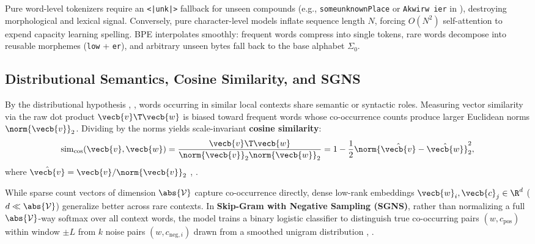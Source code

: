 \documentclass[../../../../master.tex]{subfiles}
\begin{document}
\begin{intuition}
Pure word-level tokenizers require an \texttt{<|unk|>} fallback for unseen compounds (e.g., \texttt{someunknownPlace} or \texttt{Akwirw ier} in ), destroying morphological and lexical signal. Conversely, pure character-level models inflate sequence length $N$, forcing $O(N^2)$ self-attention to expend capacity learning spelling. BPE interpolates smoothly: frequent words compress into single tokens, rare words decompose into reusable morphemes (\texttt{low} + \texttt{er}), and arbitrary unseen bytes fall back to the base alphabet $\Sigma_0$.
\end{intuition}

\subsection{Distributional Semantics, Cosine Similarity, and SGNS}

By the distributional hypothesis , , words occurring in similar local contexts share semantic or syntactic roles. Measuring vector similarity via the raw dot product $\vecb{v}\T \vecb{w}$ is biased toward frequent words whose co-occurrence counts produce larger Euclidean norms $\norm{\vecb{v}}_2$. Dividing by the norms yields scale-invariant \textbf{cosine similarity}:
\begin{equation}
  \mathrm{sim}_{\cos}(\vecb{v}, \vecb{w}) = \frac{\vecb{v}\T \vecb{w}}{\norm{\vecb{v}}_2 \norm{\vecb{w}}_2} = 1 - \frac{1}{2}\norm{\hat{\vecb{v}} - \hat{\vecb{w}}}_2^2,
  \label{eq:tok:cosine}
\end{equation}
where $\hat{\vecb{v}} = \vecb{v}/\norm{\vecb{v}}_2$ , .

While sparse count vectors of dimension $\abs{\mathcal{V}}$ capture co-occurrence directly, dense low-rank embeddings $\vecb{w}_i, \vecb{c}_j \in \R^d$ ($d \ll \abs{\mathcal{V}}$) generalize better across rare contexts. In \textbf{Skip-Gram with Negative Sampling (SGNS)}, rather than normalizing a full $\abs{\mathcal{V}}$-way softmax over all context words, the model trains a binary logistic classifier to distinguish true co-occurring pairs $(w, c_{\mathrm{pos}})$ within window $\pm L$ from $k$ noise pairs $(w, c_{\mathrm{neg}, i})$ drawn from a smoothed unigram distribution , .
\end{document}

